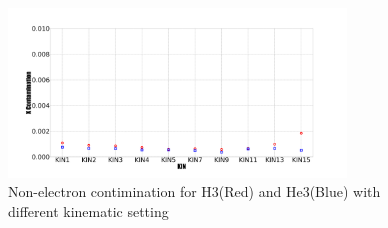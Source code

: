 \begin{figure}
 	\begin{center}
 		\includegraphics[width=0.8\textwidth]{PID5.png}
 		\caption{ Non-electron contimination for H3(Red) and He3(Blue) with different kinematic setting  } \label{PPID5}
 	\end{center}
\end{figure}   
 
%
%


